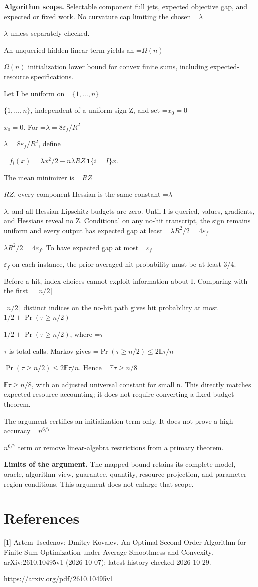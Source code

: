 \documentclass[10pt,a4paper]{article}
\newcommand{\AtlasMath}[1]{\par\begingroup\centering\setbox0=\hbox{$\displaystyle #1$}\ifdim\wd0>1.4\linewidth\typeout{ATLAS WIDE FORMULA: \the\wd0}\fi\ifdim\wd0>\linewidth\resizebox{\linewidth}{!}{\box0}\else\box0\fi\par\endgroup}
\newcommand{\AtlasInlineMath}[1]{\begingroup\setbox0=\hbox{$#1$}\ifdim\wd0>.4\linewidth\endgroup\AtlasMath{#1}\else\endgroup$#1$\fi}
\begin{document}
\textbf{Algorithm scope.} Selectable component full jets, expected objective gap, and expected or fixed work. No curvature cap limiting the chosen \AtlasInlineMath{\lambda} unless separately checked.

An unqueried hidden linear term yields an \AtlasInlineMath{\Omega(n)} initialization lower bound for convex finite sums, including expected-resource specifications.

Let I be uniform on \AtlasInlineMath{\{1,\ldots,n\}}, independent of a uniform sign Z, and set \AtlasInlineMath{x_0=0}. For \AtlasInlineMath{\lambda=8\varepsilon_f/R^2}, define

\AtlasMath{f_i(x)=\lambda x^2/2-n\lambda R Z\,\mathbf1\{i=I\}x.}

The mean minimizer is \AtlasInlineMath{RZ}, every component Hessian is the same constant \AtlasInlineMath{\lambda}, and all Hessian-Lipschitz budgets are zero. Until I is queried, values, gradients, and Hessians reveal no Z. Conditional on any no-hit transcript, the sign remains uniform and every output has expected gap at least \AtlasInlineMath{\lambda R^2/2=4\varepsilon_f}. To have expected gap at most \AtlasInlineMath{\varepsilon_f} on each instance, the prior-averaged hit probability must be at least 3/4.

Before a hit, index choices cannot exploit information about I. Comparing with the first \AtlasInlineMath{\lfloor n/2\rfloor} distinct indices on the no-hit path gives hit probability at most \AtlasInlineMath{1/2+\Pr(\tau\ge n/2)}, where \AtlasInlineMath{\tau} is total calls. Markov gives \AtlasInlineMath{\Pr(\tau\ge n/2)\le2\mathbb E\tau/n}. Hence \AtlasInlineMath{\mathbb E\tau\ge n/8}, with an adjusted universal constant for small n. This directly matches expected-resource accounting; it does not require converting a fixed-budget theorem.

The argument certifies an initialization term only. It does not prove a high-accuracy \AtlasInlineMath{n^{6/7}} term or remove linear-algebra restrictions from a primary theorem.

\textbf{Limits of the argument.} The mapped bound retains its complete model, oracle, algorithm view, guarantee, quantity, resource projection, and parameter-region conditions. This argument does not enlarge that scope.

\section{References}
[1] Artem Tsedenov; Dmitry Kovalev. An Optimal Second-Order Algorithm for Finite-Sum Optimization under Average Smoothness and Convexity. arXiv:2610.10495v1 (2026-10-07); latest history checked 2026-10-29.

\url{https://arxiv.org/pdf/2610.10495v1}
\end{document}
